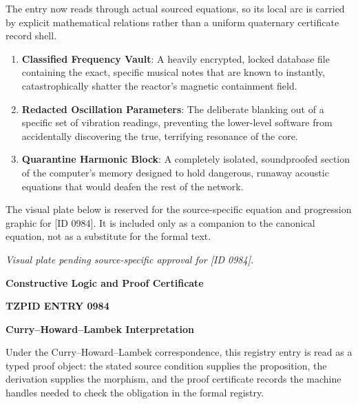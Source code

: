 The entry now reads through actual sourced equations, so its local arc is carried by explicit mathematical relations rather than a uniform quaternary certificate record shell.
\endgroup

\begin{enumerate}[leftmargin=1.6em,itemsep=6pt,topsep=4pt]
\item \textbf{Classified Frequency Vault}: A heavily encrypted, locked database file containing the exact, specific musical notes that are known to instantly, catastrophically shatter the reactor's magnetic containment field.
\item \textbf{Redacted Oscillation Parameters}: The deliberate blanking out of a specific set of vibration readings, preventing the lower-level software from accidentally discovering the true, terrifying resonance of the core.
\item \textbf{Quarantine Harmonic Block}: A completely isolated, soundproofed section of the computer's memory designed to hold dangerous, runaway acoustic equations that would deafen the rest of the network.
\end{enumerate}

\begingroup\footnotesize\sloppy
The visual plate below is reserved for the source-specific equation and progression graphic for [ID 0984]. It is included only as a companion to the canonical equation, not as a substitute for the formal text.
\par\endgroup
\begingroup\footnotesize\itshape
Visual plate pending source-specific approval for [ID 0984].
\par\endgroup

\clearpage
\begingroup\tzpsupportsetup
\noindent\textbf{\fontsize{10.8pt}{12.8pt}\selectfont [ID 0984] Constructive Logic and Proof Certificate}\par
\noindent\textbf{\fontsize{10pt}{12pt}\selectfont TZPID ENTRY 0984}\par
\vspace{0.45em}
\begingroup
\footnotesize
\setlength{\parskip}{0.22em}
\setlength{\parindent}{0pt}
\noindent\textbf{Curry--Howard--Lambek Interpretation}\par
Under the Curry--Howard--Lambek correspondence, this registry entry is read as a typed proof
object: the stated source condition supplies the proposition, the derivation supplies the
morphism, and the proof certificate records the machine handles needed to check the obligation
in the formal registry.

